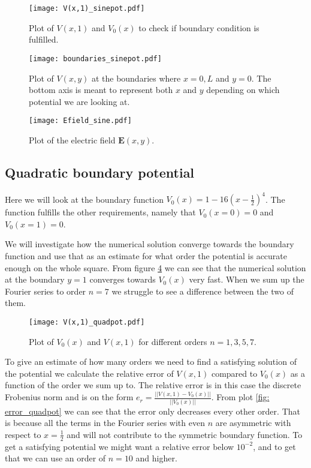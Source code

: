 \documentclass{article}
\begin{document}
\begin{figure}[!htb]
\centering
\texttt{[image: V(x,1)\_sinepot.pdf]}{}
\caption{Plot of $V(x,1)$ and $V_0(x)$ to check if boundary condition is fulfilled.}
\label{fig:V(x,1)_sinepot}
\end{figure}


\begin{figure}[!htb]
\centering
\texttt{[image: boundaries\_sinepot.pdf]}{}
\caption{Plot of $V(x,y)$ at the boundaries where $x=0,L$ and $y=0$. The bottom axis is meant to represent both $x$ and $y$ depending on which potential we are looking at.}
\label{fig:other_bond_sinepot}
\end{figure}

\begin{figure}[!htbp]
\centering
\texttt{[image: Efield\_sine.pdf]}{}
\caption{Plot of the electric field $\boldsymbol{E}(x,y)$.}
\label{fig: Efield_sinepot}
\end{figure}
\FloatBarrier

\subsection*{Quadratic boundary potential}
Here we will look at the boundary function $V_0(x)=1 - 16(x-\frac{1}{2})^4$. The function fulfills the other requirements, namely that $V_0(x=0)=0$ and $V_0(x=1)=0$. 

We will investigate how the numerical solution converge towards the boundary function and use that as an estimate for what order the potential is accurate enough on the whole square. From figure \ref{fig: V(x,1)_quadpot} we can see that the numerical solution at the boundary $y=1$ converges towards $V_0(x)$ very fast. When we sum up the Fourier series to order $n=7$ we struggle to see a difference between the two of them.
\begin{figure}[!htb]
\centering
\texttt{[image: V(x,1)\_quadpot.pdf]}{}
\caption{Plot of $V_0(x)$ and $V(x,1)$ for different orders $n=1,3,5,7$.}
\label{fig: V(x,1)_quadpot}
\end{figure}

To give an estimate of how many orders we need to find a satisfying solution of the potential we calculate the relative error of $V(x,1)$ compared to $V_0(x)$ as a function of the order we sum up to. The relative error is in this case the discrete Frobenius norm and is on the form $e_r = \frac{||V(x,1)-V_0(x)||}{||V_0(x)||}$. From plot \ref{fig: error_quadpot} we can see that the error only decreases every other order. That is because all the terms in the Fourier series with even $n$ are asymmetric with respect to $x=\frac{1}{2}$ and will not contribute to the symmetric boundary function. To get a satisfying potential we might want a relative error below $10^{-2}$, and to get that we can use an order of $n=10$ and higher. 
\end{document}
